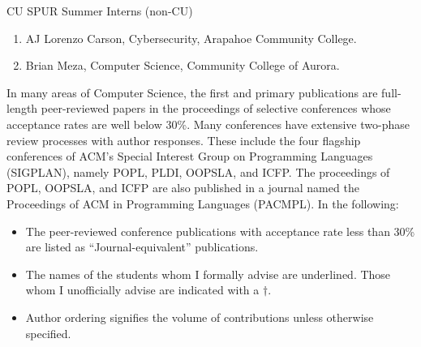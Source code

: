 \documentclass{article}
\begin{document}
\noindent CU SPUR Summer Interns (non-CU)
\begin{enumerate}
  \item AJ Lorenzo Carson, Cybersecurity, Arapahoe Community College.
  \item Brian Meza, Computer Science, Community College of Aurora.
\end{enumerate}


\vspace{1em}
In many areas of Computer Science, the first and primary publications are
full-length peer-reviewed papers in the proceedings of selective
conferences whose acceptance rates are well below 30\%. Many conferences
have extensive two-phase review processes with author responses. These
include the four flagship conferences of ACM's Special Interest Group on
Programming Languages (SIGPLAN), namely POPL, PLDI, OOPSLA, and ICFP. The
proceedings of POPL, OOPSLA, and ICFP are also published in a journal named
the Proceedings of ACM in Programming Languages (PACMPL). In the following:
\begin{itemize}
  \item The peer-reviewed conference publications with acceptance rate less
  than 30\% are listed as ``Journal-equivalent'' publications.
  \item The names of the students whom I formally advise are underlined.
  Those whom I unofficially advise are indicated with a $\dag$.
  \item Author ordering signifies the volume of contributions unless
  otherwise specified.
\end{itemize}
 

\newcommand{\ugkaki}{\textbf{Gowtham Kaki}}
\newcommand{\bec}{Bor-Yuh Evan Chang}
\newcommand{\sj}{Suresh Jagannathan}

\vspace{1em}
\end{document}
